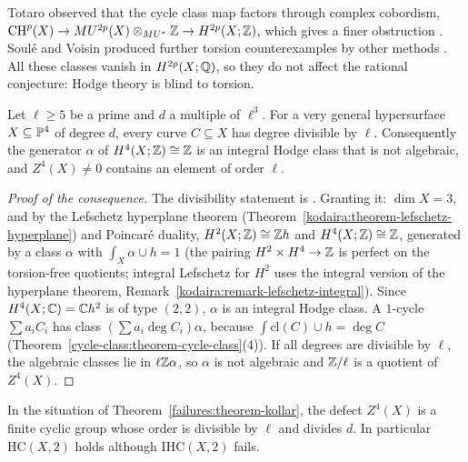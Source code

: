 \begin{remark}\label{failures:remark-totaro}
Totaro observed that the cycle class map factors through complex cobordism, $\operatorname{CH}^p(X) \to MU^{2p}(X) \otimes_{MU^*}\mathbb{Z} \to H^{2p}(X; \mathbb{Z})$, which gives a finer obstruction
\cite{totaro-1997}. Soul\'e and Voisin produced further torsion counterexamples by other methods \cite{soule-voisin-2005}. All these classes vanish in $H^{2p}(X; \mathbb{Q})$, so they do not affect the rational
conjecture: Hodge theory is blind to torsion.
\end{remark}

\begin{theorem}[Koll\'ar]\label{failures:theorem-kollar}
Let $\ell \geq 5$ be a prime and $d$ a multiple of $\ell^3$. For a very general hypersurface $X \subseteq \mathbb{P}^4$ of degree $d$, every curve $C \subseteq X$ has degree divisible by $\ell$. Consequently the
generator $\alpha$ of $H^4(X; \mathbb{Z}) \cong \mathbb{Z}$ is an integral Hodge class that is not algebraic, and $Z^4(X) \neq 0$ contains an element of order $\ell$.
\end{theorem}

\begin{proof}[Proof of the consequence]
The divisibility statement is \cite{kollar-1992}. Granting it: $\dim X = 3$, and by the Lefschetz hyperplane theorem (Theorem~\ref{kodaira:theorem-lefschetz-hyperplane}) and Poincar\'e duality,
$H^2(X; \mathbb{Z}) \cong \mathbb{Z} h$ and $H^4(X; \mathbb{Z}) \cong \mathbb{Z}$, generated by a class $\alpha$ with $\int_X\alpha \cup h = 1$ (the pairing $H^2 \times H^4 \to \mathbb{Z}$ is perfect on the torsion-free quotients; integral
Lefschetz for $H^2$ uses the integral version of the hyperplane theorem, Remark~\ref{kodaira:remark-lefschetz-integral}). Since $H^4(X; \mathbb{C}) = \mathbb{C} h^2$ is of type $(2,2)$, $\alpha$ is an integral Hodge class. A
$1$-cycle $\sum a_iC_i$ has class $(\sum a_i\deg C_i)\alpha$, because $\int\mathrm{cl}(C) \cup h = \deg C$ (Theorem~\ref{cycle-class:theorem-cycle-class}(4)). If all degrees are divisible by $\ell$, the algebraic
classes lie in $\ell\mathbb{Z}\alpha$, so $\alpha$ is not algebraic and $\mathbb{Z}/\ell$ is a quotient of $Z^4(X)$.
\end{proof}

\begin{corollary}\label{failures:corollary-kollar-defect}
In the situation of Theorem~\ref{failures:theorem-kollar}, the defect $Z^4(X)$ is a finite cyclic group whose order is divisible by $\ell$ and divides $d$. In particular $\mathrm{HC}(X, 2)$ holds although
$\mathrm{IHC}(X, 2)$ fails.
\end{corollary}

